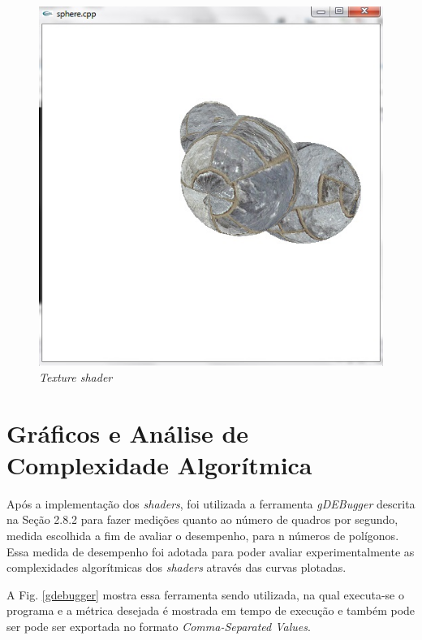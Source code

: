 \begin{description}
	\begin{figure}[h]
	\centering
		\includegraphics[keepaspectratio=true,scale=0.5]{figuras/texture.jpg}
	\caption{\textit{Texture shader}}
	\label{texture_shader}
	\end{figure}


\end{description}

\section{Gráficos e Análise de Complexidade Algorítmica}

	Após a implementação dos \textit{shaders}, foi utilizada a ferramenta \textit{gDEBugger} descrita na Seção 2.8.2 para fazer medições quanto ao número de quadros por segundo, medida escolhida a fim de avaliar o desempenho, para n números de polígonos. Essa medida de desempenho foi adotada para poder avaliar experimentalmente as complexidades algorítmicas dos \textit{shaders} através das curvas plotadas.

	 A   Fig. \ref{gdebugger} mostra essa ferramenta sendo utilizada, na qual executa-se o programa e a métrica desejada é mostrada em tempo de execução e também pode ser pode ser exportada no formato  \textit{Comma-Separated Values}.  

